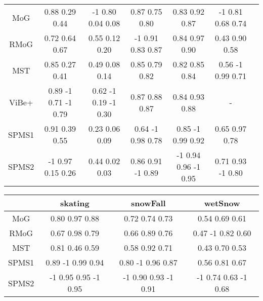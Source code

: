\begin{table*}[!t]
\begin{tabular*}{\textwidth}{@{\extracolsep{\fill}}ccccccc}
\hline
MoG 	& 0.88 0.29 0.44 		& -1 0.80 0.04 0.08 	& 0.87 0.75 0.80 	& 0.83 0.92 0.87  		& -1 0.81 0.68 0.74  \\
RMoG 	& 0.72 0.64 0.67 		& 0.55 0.12 0.20 		& -1 0.91 0.83 0.87 & 0.84 0.97 0.90 		& 0.43 0.90 0.58 \\
MST 	& 0.85 0.27 0.41 		& 0.49 0.08 0.14 		& 0.85 0.79 0.82 	& 0.82 0.85 0.84  		& 0.56 -1 0.99 0.71 \\
ViBe+ 	& 0.89 -1 0.71 -1 0.79 	& 0.62 -1 0.19 -1 0.30 	& 0.87 0.88 0.87 	& 0.84 0.93 0.88 		& - \\
\hline
SPMS1 	& 0.91 0.39 0.55 		& 0.23 0.06 0.09 		& 0.64 -1 0.98 0.78 & 0.85 -1 0.99 0.92 	& 0.65 0.97 0.78 \\
SPMS2 	& -1 0.97 0.15 0.26 	& 0.44 0.02 0.03 		& 0.86 0.91 -1 0.89 & -1 0.94 0.96 -1 0.95 	& 0.71 0.93 -1 0.80 \\
\hline
\end{tabular*}
\begin{tabular*}{0.618\textwidth}{@{\extracolsep{\fill}}cccc}
\hline
             & skating 			 & snowFall 			& wetSnow 	 \\
\hline
MoG 	& 0.80 0.97 0.88 		& 0.72 0.74 0.73 		& 0.54 0.69 0.61 \\
RMoG  	& 0.67 0.98 0.79 		& 0.66 0.89 0.76 		& 0.47 -1 0.82 0.60 \\
MST  	& 0.81 0.46 0.59 		& 0.58 0.92 0.71 		& 0.43 0.70 0.53 \\
\hline
SPMS1 & 0.89 -1 0.99 0.94 		& 0.80 -1 0.96 0.87 	& 0.56 0.81 0.67 \\
SPMS2 & -1 0.95 0.95 -1 0.95 	& -1 0.90 0.93 -1 0.91 	& -1 0.74 0.63 -1 0.68 \\
\hline
\end{tabular*}
\end{table*}

